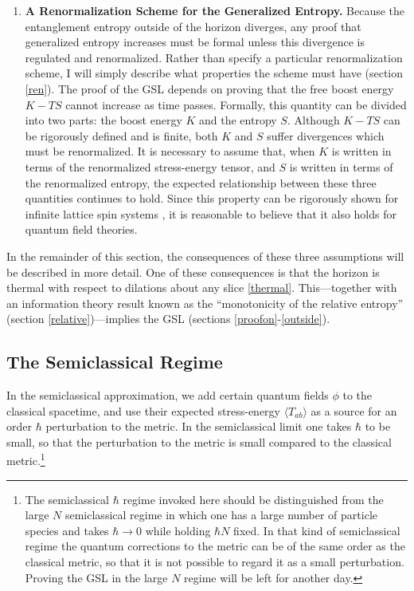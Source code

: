 \documentclass[12pt]{article}
\begin{document}
\begin{enumerate}
\item \textbf{A Renormalization Scheme for the Generalized Entropy.}  Because the entanglement entropy outside of the horizon diverges, any proof that generalized entropy increases must be formal unless this divergence is regulated and renormalized.  Rather than specify a particular renormalization scheme, I will simply describe what properties the scheme must have (section \ref{ren}).  The proof of the GSL depends on proving that the free boost energy $K - TS$ cannot increase as time passes.  Formally, this quantity can be divided into two parts: the boost energy $K$ and the entropy $S$.  Although $K - TS$ can be rigorously defined and is finite, both $K$ and $S$ suffer divergences which must be renormalized.  It is necessary to assume that, when $K$ is written in terms of the renormalized stress-energy tensor, and $S$ is written in terms of the renormalized entropy, the expected relationship between these three quantities continues to hold.  Since this property can be rigorously shown for infinite lattice spin systems \cite{AS77}, it is reasonable to believe that it also holds for quantum field theories.
\end{enumerate}

\noindent In the remainder of this section, the consequences of these three assumptions will be described in more detail.  One of these consequences is that the horizon is thermal with respect to dilations about any slice \ref{thermal}.  This---together with an information theory result known as the ``monotonicity of the relative entropy'' (section \ref{relative})---implies the GSL (sections \ref{proofon}-\ref{outside}).

\subsection{The Semiclassical Regime}\label{sreg}

In the semiclassical approximation, we add certain quantum fields $\phi$ to the classical spacetime, and use their expected stress-energy $\langle T_{ab} \rangle$ as a source for an order $\hbar$ perturbation to the metric.  In the semiclassical limit one takes $\hbar$ to be small, so that the perturbation to the metric is small compared to the classical metric.\footnote{The semiclassical $\hbar$ regime invoked here should be distinguished from the large $N$ semiclassical regime in which one has a large number of particle species and takes $\hbar \to 0$ while holding $\hbar N$ fixed.  In that kind of semiclassical regime the quantum corrections to the metric can be of the same order as the classical metric, so that it is not possible to regard it as a small perturbation.  Proving the GSL in the large $N$ regime will be left for another day.}
\end{document}
